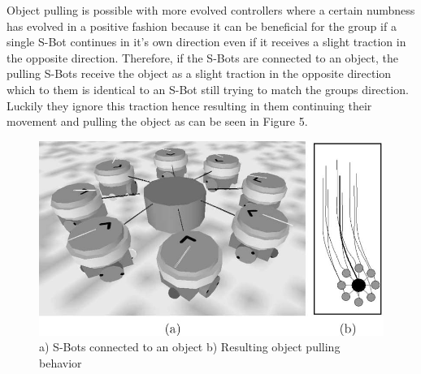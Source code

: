Object pulling is possible with more evolved controllers where a certain
numbness has evolved in a positive fashion because it can be
beneficial for the group if a single S-Bot continues in it's own direction
even if it receives a slight traction in the opposite direction. Therefore,
if the S-Bots are connected to an object, the pulling S-Bots receive the
object as a slight traction in the opposite direction which to them is
identical to an S-Bot still trying to match the groups direction. Luckily
they ignore this traction hence resulting in them continuing their movement
and pulling the object as can be seen in Figure 5.
\ \\

\begin{figure}[h]
  \centering
    \includegraphics[width=0.65\linewidth]{pics/14.png}
  \caption{a) S-Bots connected to an object b) Resulting object pulling behavior}
  \label{}
\end{figure}

